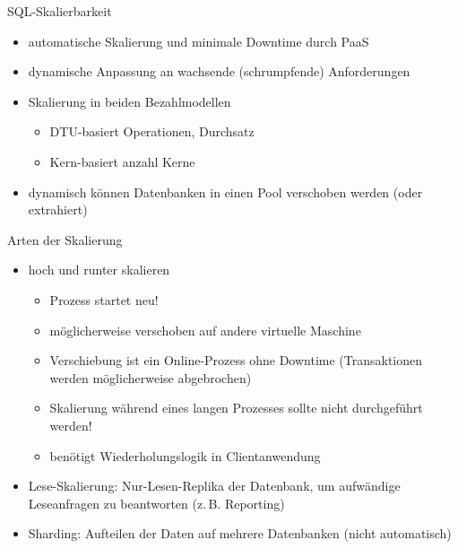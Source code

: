 
\begin{flashcard}[Definition]{SQL-Skalierbarkeit}
  \begin{itemize}
    \item automatische Skalierung und minimale Downtime durch PaaS
    \item dynamische Anpassung an wachsende (schrumpfende) Anforderungen
    \item Skalierung in beiden Bezahlmodellen
      \begin{itemize}
        \item DTU-basiert\newline
          Operationen, Durchsatz
        \item Kern-basiert\newline
          anzahl Kerne
      \end{itemize}
    \item dynamisch können Datenbanken in einen Pool verschoben werden\newline
      (oder extrahiert)
  \end{itemize}
\end{flashcard}

\begin{flashcard}[Definition]{Arten der Skalierung}
  \begin{itemize}
    \item hoch und runter skalieren
      \begin{itemize}
        \item Prozess startet neu!
        \item möglicherweise verschoben auf andere virtuelle Maschine
        \item Verschiebung ist ein Online-Prozess ohne Downtime\newline
          (Transaktionen werden möglicherweise abgebrochen)
        \item Skalierung während eines langen Prozesses sollte nicht durchgeführt werden!
        \item benötigt Wiederholungslogik in Clientanwendung
      \end{itemize}
    \item Lese-Skalierung: Nur-Lesen-Replika der Datenbank, um aufwändige\newline
      Leseanfragen zu beantworten (z.\,B. Reporting)
    \item Sharding: Aufteilen der Daten auf mehrere Datenbanken\newline
      (nicht automatisch)
  \end{itemize}
\end{flashcard}

